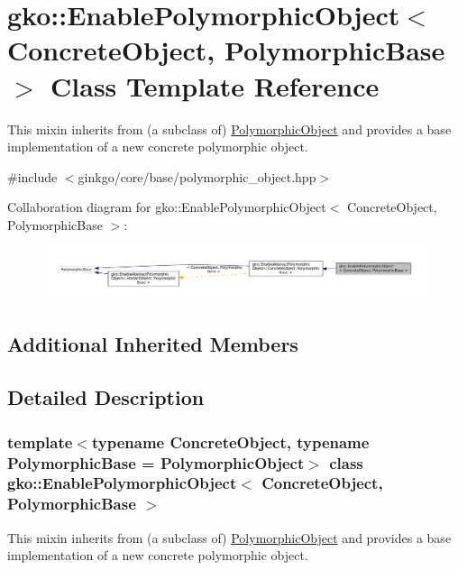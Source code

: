 \hypertarget{classgko_1_1EnablePolymorphicObject}{}\section{gko\+:\+:Enable\+Polymorphic\+Object$<$ Concrete\+Object, Polymorphic\+Base $>$ Class Template Reference}
\label{classgko_1_1EnablePolymorphicObject}


This mixin inherits from (a subclass of) \hyperlink{classgko_1_1PolymorphicObject}{Polymorphic\+Object} and provides a base implementation of a new concrete polymorphic object.  




{\ttfamily \#include $<$ginkgo/core/base/polymorphic\+\_\+object.\+hpp$>$}



Collaboration diagram for gko\+:\+:Enable\+Polymorphic\+Object$<$ Concrete\+Object, Polymorphic\+Base $>$\+:
\nopagebreak
\begin{figure}[H]
\begin{center}
\leavevmode
\includegraphics[width=350pt]{classgko_1_1EnablePolymorphicObject__coll__graph}
\end{center}
\end{figure}
\subsection*{Additional Inherited Members}


\subsection{Detailed Description}
\subsubsection*{template$<$typename Concrete\+Object, typename Polymorphic\+Base = Polymorphic\+Object$>$\newline
class gko\+::\+Enable\+Polymorphic\+Object$<$ Concrete\+Object, Polymorphic\+Base $>$}

This mixin inherits from (a subclass of) \hyperlink{classgko_1_1PolymorphicObject}{Polymorphic\+Object} and provides a base implementation of a new concrete polymorphic object. 

